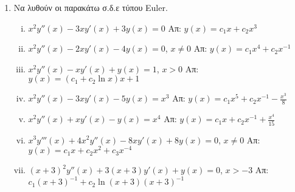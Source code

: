 \begin{enumerate}
			\item Να λυθούν οι παρακάτω σ.δ.ε τύπου \textlatin{Euler}.

				\begin{enumerate}[i)]
					\item $ x^{2}y''(x)-3xy'(x)+3y(x)=0 $ \hfill Απ: $ y(x)=c_{1}x + c_{2}x^{3} $
					\item $ x^{2}y''(x)-2xy'(x)-4y(x)=0 $,\; $ x \neq 0 $ \hfill Απ: $
						y(x)=c_{1}x^{4}+ c_{2} x^{-1} $ 
					\item $ x^{2}y''(x)-xy'(x)+y(x)=1 $,\; $ x>0 $ \hfill Απ: $ y(x)=(c_{1}+c_{2}
						\ln{x})x + 1 $  
					\item $ x^{2}y''(x)-3xy'(x)-5y(x)=x^{3} $ \hfill Απ: $ y(x)=c_{1}x^{5}+ c_{2}
						x^{-1}- \frac{x^{3}}{8} $ 
					\item $ x^{2}y''(x)+xy'(x)-y(x)=x^{4} $ \hfill Απ: $ y(x)=c_{1}x+c_{2}x^{-1}+
						\frac{x^{4}}{15} $ 
					\item $ x^{3}y'''(x)+4x^{2}y''(x)-8xy'(x)+8y(x)=0 $,\; $ x \neq 0 $ \hfill Απ:
						$y(x)=c_{1}x+c_{2}x^{2}+c_{3}x^{-4}$ 
					\item \label{eul} $ (x+3)^{2}y''(x)+3(x+3)y'(x)+y(x)=0 $,\; $ x>-3 $ \hfill Απ:
						$\scriptstyle{ c_{1}
						(x+3)^{-1} + c_{2}\ln(x+3)(x+3)^{-1}} $
				\end{enumerate}

\end{enumerate}




